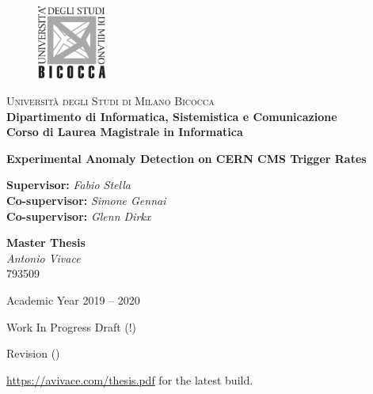 
\thispagestyle{empty}

\begin{figure}
	\vspace*{-8mm}
	\centering
	\includegraphics[width=0.20\textwidth]{logo-bicocca.jpg}
\end{figure}
\large \noindent \textsc{Università degli Studi di Milano Bicocca} \\
\textbf{Dipartimento di Informatica, Sistemistica e Comunicazione \\
	Corso di Laurea Magistrale in Informatica}

\vfill


\begin{center}
	{\Huge \textbf{Experimental Anomaly Detection on CERN CMS Trigger Rates}}
\end{center}

\vfill

\begin{flushleft}
	{\Large \textbf{Supervisor:} \textit{Fabio Stella} \\
		\textbf{Co-supervisor:} \textit{Simone Gennai} \\
		\textbf{Co-supervisor:} \textit{Glenn Dirkx}}
\end{flushleft}

\vspace{8mm}
\par

\begin{flushright}
	{\Large \textbf{Master Thesis} \\
		\textit{Antonio Vivace} \\ 793509}
\end{flushright}

\vfill
\par

\begin{center}
	{\large Academic Year 2019 -- 2020}

	\hfill\linebreak
	Work In Progress Draft (!)

	Revision \texttt{\revision} (\texttt{\revisiondate})

	\url{https://avivace.com/thesis.pdf} for the latest build.
\end{center}

\clearpage